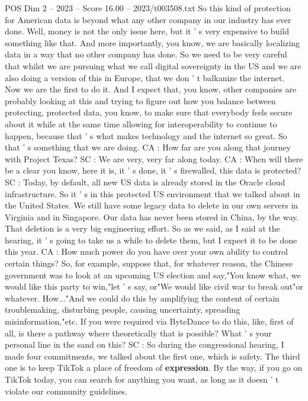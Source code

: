 \begin{textsample}{POS Dim 2 – 2023 – Score 16.00 – 2023/t003508.txt}
So this kind of protection for American data is beyond what any other company in our industry has ever done.
Well, money is not the only issue here, but it ' s very expensive to build something like that.
And more importantly, you know, we are basically localizing data in a way that no other company has done.
So we need to be very careful that whilst we are pursuing what we call digital sovereignty in the US and we are also doing a version of this in Europe, that we don ' t balkanize the internet.
Now we are the first to do it.
And I expect that, you know, other companies are probably looking at this and trying to figure out how you balance between protecting, protected data, you know, to make sure that everybody feels secure about it while at the same time allowing for interoperability to continue to happen, because that ' s what makes technology and the internet so great.
So that ' s something that we are doing.
CA : How far are you along that journey with Project Texas?
SC : We are very, very far along today.
CA : When will there be a clear you know, here it is, it ' s done, it ' s firewalled, this data is protected?
SC : Today, by default, all new US data is already stored in the Oracle cloud infrastructure.
So it ' s in this protected US environment that we talked about in the United States.
We still have some legacy data to delete in our own servers in Virginia and in Singapore.
Our data has never been stored in China, by the way.
That deletion is a very big engineering effort.
So as we said, as I said at the hearing, it ' s going to take us a while to delete them, but I expect it to be done this year.
CA : How much power do you have over your own ability to control certain things?
So, for example, suppose that, for whatever reason, the Chinese government was to look at an upcoming US election and say,"You know what, we would like this party to win,"let ' s say, or"We would like civil war to break out"or whatever.
How..."And we could do this by amplifying the content of certain troublemaking, disturbing people, causing uncertainty, spreading misinformation,"etc.
If you were required via ByteDance to do this, like, first of all, is there a pathway where theoretically that is possible?
What ' s your personal line in the sand on this?
SC : So during the congressional hearing, I made four commitments, we talked about the first one, which is safety.
The third one is to keep TikTok a place of freedom of \textbf{expression}.
By the way, if you go on TikTok today, you can search for anything you want, as long as it doesn ' t violate our community guidelines.

\end{textsample}
